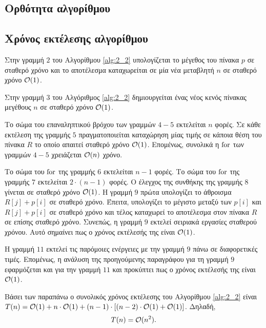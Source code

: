 	\texttt{}

\subsection{Ορθότητα αλγορίθμου}

\subsection{Χρόνος εκτέλεσης αλγορίθμου}

Στην γραμμή $2$ του Αλγορίθμου \ref{alg:2_2} υπολογίζεται το μέγεθος του πίνακα $p$ σε σταθερό χρόνο και το αποτέλεσμα καταχωρείται σε μία νέα μεταβλητή $n$ σε σταθερό χρόνο $\mathcal{O}(1)$.\par
Στην γραμμή $3$ του Αλγόριθμος \ref{alg:2_2} δημιουργείται ένας νέος κενός πίνακας μεγέθους $n$ σε σταθερό χρόνο $\mathcal{O}(1)$.\par
Το σώμα του επαναληπτικού βρόχου των γραμμών $4-5$ εκτελείται $n$ φορές. Σε κάθε εκτέλεση της γραμμής $5$ πραγματοποιείται καταχώρηση μίας τιμής σε κάποια θέση του πίνακα $R$ το οποίο απαιτεί σταθερό χρόνο $\mathcal{O}(1)$. Επομένως, συνολικά η $\text{{for}}$ των γραμμών $4-5$ χρειάζεται $\mathcal{O}(n)$ χρόνο.\par
Το σώμα του $\text{{for}}$ της γραμμής $6$ εκτελείται $n-1$ φορές. Το σώμα του $\text{{for}}$ της γραμμής $7$ εκτελείται $2\cdot(n-1)$ φορές. Ο έλεγχος της συνθήκης της γραμμής $8$ γίνεται σε σταθερό χρόνο $\mathcal{O}(1)$. Η γραμμή $9$ πρώτα υπολογίζει το άθροισμα $R[j]+p[i]$ σε σταθερό χρόνο. Έπειτα, υπολογίζει το μέγιστο μεταξύ των $p[i]$ και $R[j]+p[i]$ σε σταθερό χρόνο και τέλος καταχωρεί το αποτέλεσμα στον πίνακα $R$ σε επίσης σταθερό χρόνο. Συνεπώς, η γραμμή $9$ εκτελεί σειριακά εργασίες σταθερού χρόνου. Αυτό σημαίνει πως ο χρόνος εκτέλεσής της είναι $\mathcal{O}(1)$.\par
Η γραμμή $11$ εκτελεί τις παρόμοιες ενέργειες με την γραμμή $9$ πάνω σε διαφορετικές τιμές. Επομένως, η ανάλυση της προηγούμενης παραγράφου για τη γραμμή $9$ εφαρμόζεται και για την γραμμή $11$ και προκύπτει πως ο χρόνος εκτέλεσής της είναι $\mathcal{O}(1)$.\par
Βάσει των παραπάνω ο συνολικός χρόνος εκτέλεσης του Αλγορίθμου \ref{alg:2_2} είναι $T(n)=\mathcal{O}(1)+n\cdot\mathcal{O}(1)+(n-1)\cdot\left[(n-2)\cdot\mathcal{O}(1)+\mathcal{O}(1)\right]$. Δηλαδή,
\begin{equation}
	T(n)=\mathcal{O}(n^2).
\end{equation}